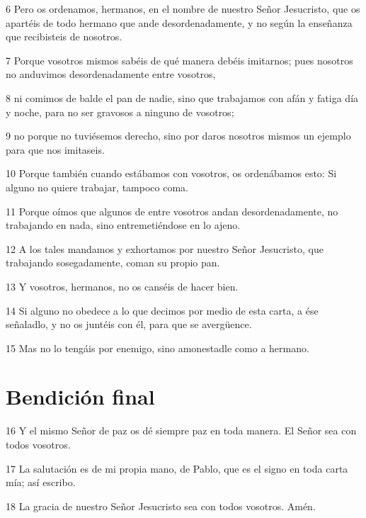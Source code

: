 \par 6 Pero os ordenamos, hermanos, en el nombre de nuestro Señor Jesucristo, que os apartéis de todo hermano que ande desordenadamente, y no según la enseñanza que recibisteis de nosotros.
\par 7 Porque vosotros mismos sabéis de qué manera debéis imitarnos; pues nosotros no anduvimos desordenadamente entre vosotros,
\par 8 ni comimos de balde el pan de nadie, sino que trabajamos con afán y fatiga día y noche, para no ser gravosos a ninguno de vosotros;
\par 9 no porque no tuviésemos derecho, sino por daros nosotros mismos un ejemplo para que nos imitaseis.
\par 10 Porque también cuando estábamos con vosotros, os ordenábamos esto: Si alguno no quiere trabajar, tampoco coma.
\par 11 Porque oímos que algunos de entre vosotros andan desordenadamente, no trabajando en nada, sino entremetiéndose en lo ajeno.
\par 12 A los tales mandamos y exhortamos por nuestro Señor Jesucristo, que trabajando sosegadamente, coman su propio pan.
\par 13 Y vosotros, hermanos, no os canséis de hacer bien.
\par 14 Si alguno no obedece a lo que decimos por medio de esta carta, a ése señaladlo, y no os juntéis con él, para que se avergüence.
\par 15 Mas no lo tengáis por enemigo, sino amonestadle como a hermano.

\section*{Bendición final}

\par 16 Y el mismo Señor de paz os dé siempre paz en toda manera. El Señor sea con todos vosotros.
\par 17 La salutación es de mi propia mano, de Pablo, que es el signo en toda carta mía; así escribo.
\par 18 La gracia de nuestro Señor Jesucristo sea con todos vosotros. Amén.

